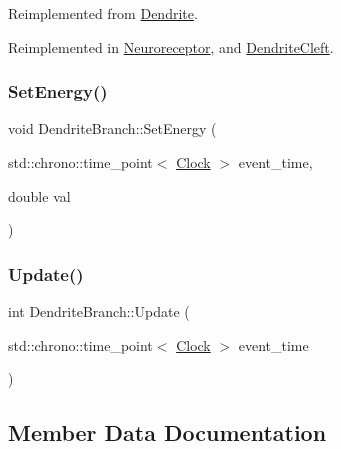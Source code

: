 Reimplemented from \mbox{\hyperlink{classDendrite_a7529495515de74fff2b9a92b12531057}{Dendrite}}.



Reimplemented in \mbox{\hyperlink{classNeuroreceptor_a0660a316ef44cf723509f720acd16f24}{Neuroreceptor}}, and \mbox{\hyperlink{classDendriteCleft_a428b8e5117f381a382e0071b936d42a1}{Dendrite\+Cleft}}.

\mbox{\label{classDendriteBranch_a13dd0373022d653448c9067d075586a8}} 
\subsubsection{\texorpdfstring{Set\+Energy()}{SetEnergy()}}
{\footnotesize\ttfamily void Dendrite\+Branch\+::\+Set\+Energy (\begin{DoxyParamCaption}\item[{std\+::chrono\+::time\+\_\+point$<$ \mbox{\hyperlink{universe_8h_a0ef8d951d1ca5ab3cfaf7ab4c7a6fd80}{Clock}} $>$}]{event\+\_\+time,  }\item[{double}]{val }\end{DoxyParamCaption})\hspace{0.3cm}{\ttfamily [inline]}}

\mbox{\label{classDendriteBranch_a8540dfafeb5bd45f782ab31b8231b10f}} 
\subsubsection{\texorpdfstring{Update()}{Update()}}
{\footnotesize\ttfamily int Dendrite\+Branch\+::\+Update (\begin{DoxyParamCaption}\item[{std\+::chrono\+::time\+\_\+point$<$ \mbox{\hyperlink{universe_8h_a0ef8d951d1ca5ab3cfaf7ab4c7a6fd80}{Clock}} $>$}]{event\+\_\+time }\end{DoxyParamCaption})}



\subsection{Member Data Documentation}
\mbox{\label{classDendriteBranch_a44ed56dc44bea543b97a6924024edaa8}} 
